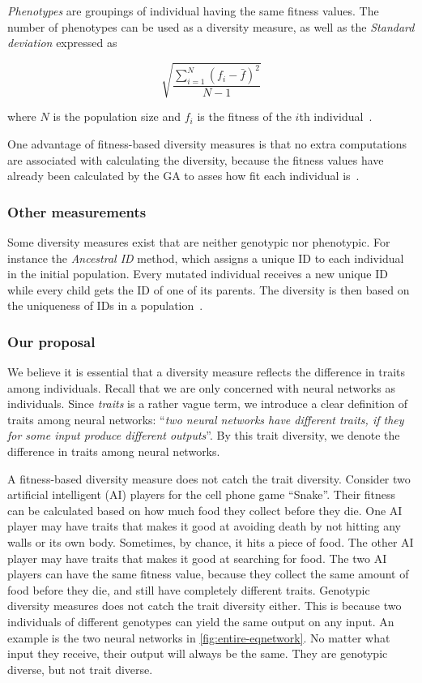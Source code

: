 \emph{Phenotypes} are groupings of individual having the same fitness values. 
The number of phenotypes can be used as a diversity measure, as well as the \emph{Standard deviation} expressed as

\[\sqrt{\frac{\sum_{i=1}^N{(f_i-\bar{f})^2}}{N-1}}\]

where $N$ is the population size and $f_i$ is the fitness of the $i$th individual~\cite{1250187}.

One advantage of fitness-based diversity measures is that no extra computations are associated with calculating the diversity, because the fitness values have already been calculated by the GA to asses how fit each individual is~\cite{Nguyen:2006:ASPGP}.

\subsubsection{Other measurements}
Some diversity measures exist that are neither genotypic nor phenotypic. For instance the \emph{Ancestral ID} method, which assigns a unique ID to each individual in the initial population.
Every mutated individual receives a new unique ID while every child gets the ID of one of its parents.
The diversity is then based on the uniqueness of IDs in a population~\cite{1250187}.

\subsubsection{Our proposal}
We believe it is essential that a diversity measure reflects the difference in traits among individuals.
Recall that we are only concerned with neural networks as individuals. 
Since \emph{traits} is a rather vague term, we introduce a clear definition of traits among neural networks: ``\emph{two neural networks have different traits, if they for some input produce different outputs}''. By this trait diversity, we denote the difference in traits among neural networks.

A fitness-based diversity measure does not catch the trait diversity. Consider two artificial intelligent (AI) players for the cell phone game ``Snake''. Their fitness can be calculated based on how much food they collect before they die. One AI player may have traits that makes it good at avoiding death by not hitting any walls or its own body. Sometimes, by chance, it hits a piece of food. The other AI player may have traits that makes it good at searching for food. The two AI players can have the same fitness value, because they collect the same amount of food before they die, and still have completely different traits.
Genotypic diversity measures does not catch the trait diversity either. This is because two individuals of different genotypes can yield the same output on any input. An example is the two neural networks in \cref{fig:entire-eqnetwork}. No matter what input they receive, their output will always be the same. They are genotypic diverse, but not trait diverse.

